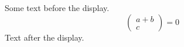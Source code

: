 \documentclass[12pt]{article}
\begin{document}
Some text before the display.
\[ \left( \begin{gathered} a + b \\ c \end{gathered} \right) = 0 \]
Text after the display.
\end{document}
